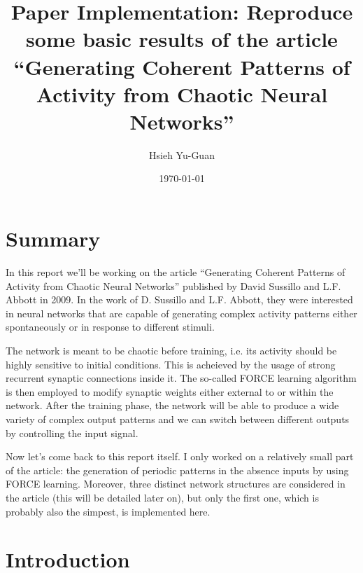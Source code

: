 

\pagestyle{fancy} 
\rhead{}
\rfoot{\thepage}
\cfoot{}
\lfoot{~\theauthor}
\renewcommand{\headrulewidth}{0.4pt}
\renewcommand{\footrulewidth}{0.4pt}


\title{Paper Implementation: Reproduce some basic results
of the article ``Generating Coherent Patterns of Activity from
Chaotic Neural Networks''\vspace{-0.5em}}
\author{Hsieh Yu-Guan}
\date{\today}
\maketitle

\thispagestyle{fancy}

\setcounter{secnumdepth}{0}


\section{Summary}

In this report we'll be working on the article ``Generating Coherent
Patterns of Activity from Chaotic Neural Networks'' published by 
David Sussillo and L.F. Abbott in 2009. In the work of D. Sussillo and L.F.
Abbott, they were interested in neural networks that are capable of
generating complex activity patterns either spontaneously or in response to
different stimuli.

The network is meant to be chaotic before training, i.e.
its activity should be highly sensitive to initial conditions. This is
acheieved by the usage of strong recurrent synaptic connections inside it. 
The so-called FORCE learning algorithm is then employed to modify
synaptic weights either external to or within the network. 
After the training phase, the network will be able to produce a wide 
variety of complex output patterns and we can switch between different
outputs by controlling the input signal.

Now let's come back to this report itself. I only worked on a relatively 
small part of the article: the generation of periodic patterns in the 
absence inputs by using FORCE learning. Moreover, three distinct network
structures are considered in the article (this will be detailed later on), 
but only the first one, which is probably also the simpest, is implemented 
here.


\section{Introduction}

